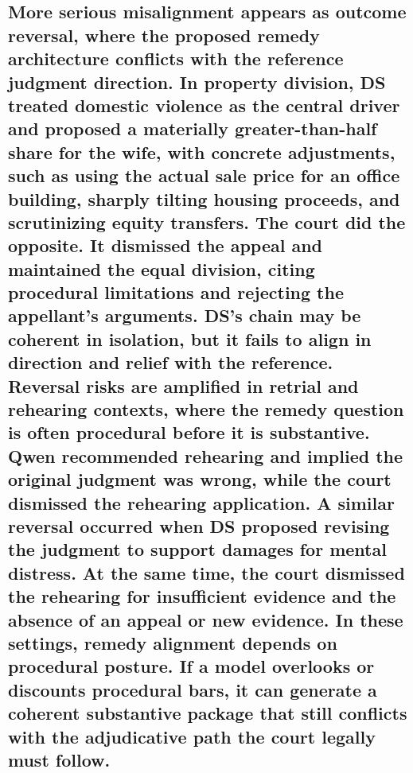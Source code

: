 {\subsection{More serious misalignment appears as outcome reversal, where the proposed remedy architecture conflicts with the reference judgment direction. In property division, DS treated domestic violence as the central driver and proposed a materially greater-than-half share for the wife, with concrete adjustments, such as using the actual sale price for an office building, sharply tilting housing proceeds, and scrutinizing equity transfers. The court did the opposite. It dismissed the appeal and maintained the equal division, citing procedural limitations and rejecting the appellant's arguments. DS's chain may be coherent in isolation, but it fails to align in direction and relief with the reference. Reversal risks are amplified in retrial and rehearing contexts, where the remedy question is often procedural before it is substantive. Qwen recommended rehearing and implied the original judgment was wrong, while the court dismissed the rehearing application. A similar reversal occurred when DS proposed revising the judgment to support damages for mental distress. At the same time, the court dismissed the rehearing for insufficient evidence and the absence of an appeal or new evidence. In these settings, remedy alignment depends on procedural posture. If a model overlooks or discounts procedural bars, it can generate a coherent substantive package that still conflicts with the adjudicative path the court legally must follow.}\label{more-serious-misalignment-appears-as-outcome-reversal-where-the-proposed-remedy-architecture-conflicts-with-the-reference-judgment-direction.-in-property-division-ds-treated-domestic-violence-as-the-central-driver-and-proposed-a-materially-greater-than-half-share-for-the-wife-with-concrete-adjustments-such-as-using-the-actual-sale-price-for-an-office-building-sharply-tilting-housing-proceeds-and-scrutinizing-equity-transfers.-the-court-did-the-opposite.-it-dismissed-the-appeal-and-maintained-the-equal-division-citing-procedural-limitations-and-rejecting-the-appellants-arguments.-dss-chain-may-be-coherent-in-isolation-but-it-fails-to-align-in-direction-and-relief-with-the-reference.-reversal-risks-are-amplified-in-retrial-and-rehearing-contexts-where-the-remedy-question-is-often-procedural-before-it-is-substantive.-qwen-recommended-rehearing-and-implied-the-original-judgment-was-wrong-while-the-court-dismissed-the-rehearing-application.-a-similar-reversal-occurred-when-ds-proposed-revising-the-judgment-to-support-damages-for-mental-distress.-at-the-same-time-the-court-dismissed-the-rehearing-for-insufficient-evidence-and-the-absence-of-an-appeal-or-new-evidence.-in-these-settings-remedy-alignment-depends-on-procedural-posture.-if-a-model-overlooks-or-discounts-procedural-bars-it-can-generate-a-coherent-substantive-package-that-still-conflicts-with-the-adjudicative-path-the-court-legally-must-follow.}}

